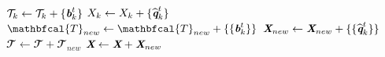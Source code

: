\begin{algorithm}
\begin{algorithmic}[1]
                \State $\mathcal{T}_k \leftarrow \mathcal{T}_k + \{\textbf{\em b}^t_{k}\}$
                \State $X_k \leftarrow X_k + \{\widehat{\textbf{\em q}}^t_{k}\}$
            \EndIf
        \EndFor
                \State $\mathbfcal{T}_{new} \leftarrow \mathbfcal{T}_{new} + \{\{\mathbi{b}^t_{k}\}\}$
                \State $\textbf{\em X}_{new} \leftarrow \textbf{\em X}_{new} + \{\{\widehat{\textbf{\em q}}^t_{k}\}\}$
            \EndIf
        \EndFor
        \State $\mathbfcal{T} \leftarrow \mathbfcal{T} + \mathbfcal{T}_{new}$
        \State $\textbf{\em X} \leftarrow \textbf{\em X} + \textbf{\em X}_{new}$
    \EndFor
    \end{algorithmic}
    \label{alg:memot}
\end{algorithm}

        
        
